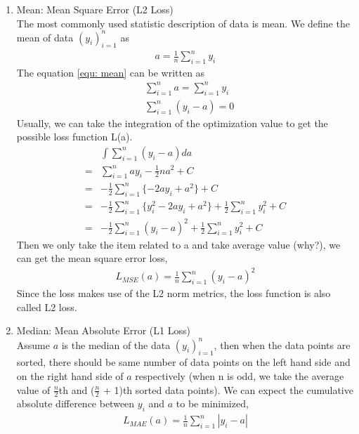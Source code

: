 \documentclass[11pt]{article}
\begin{document}
\begin{enumerate}
    \item Mean: Mean Square Error (L2 Loss)\\
    The most commonly used statistic description of data is mean. We define the mean of data $(y_i)_{i=1}^{n}$ as
    \begin{align}
        \label{equ: mean}
        a = \frac{1}{n} \sum_{i = 1}^{n} y_i
    \end{align}
     The equation \ref{equ: mean} can be written as
    \begin{align}
        & \sum_{i=1}^n a = \sum_{i = 1}^{n} y_i\\
        & \sum_{i = 1}^{n} (y_i - a) = 0
    \end{align}
    Usually, we can take the integration of the optimization value to get the possible loss function L(a).
    \begin{align}
        & \int \sum_{i = 1}^{n} (y_i - a) da\\
        =& \sum_{i = 1}^{n} ay_i - \frac{1}{2}n a^2 + C\\
        =& -\frac{1}{2}\sum_{i = 1}^{n} \{-2ay_i + a^2\} + C\\
        =& -\frac{1}{2}\sum_{i = 1}^{n} \{y_i^2 -2ay_i + a^2\} + \frac{1}{2}\sum_{i=1}^n y_i^2 + C\\
        =& -\frac{1}{2}\sum_{i = 1}^{n} (y_i - a)^2 + \frac{1}{2}\sum_{i=1}^n y_i^2 + C
    \end{align}
    Then we only take the item related to a and take average value (why?), we can get the mean square error loss,
    \begin{align}
        L_{MSE}(a) = \frac{1}{n} \sum_{i=1}^{n} (y_i - a)^2
    \end{align}
    Since the loss makes use of the L2 norm metrics, the loss function is also called L2 loss. 
    \item Median: Mean Absolute Error (L1 Loss)\\
    Assume $a$ is the median of the data $(y_i)_{i=1}^n$, then when the data points are sorted, there should be same number of data points on the left hand side and on the right hand side of $a$ respectively (when n is odd, we take the average value of $\frac{n}{2}$th and ($\frac{n}{2}$ + 1)th sorted data points). We can expect the cumulative absolute difference between $y_i$ and $a$ to be minimized,
    \begin{align}
        L_{MAE}(a) = \frac{1}{n} \sum_{i = 1}^n |y_i - a|
    \end{align}

\end{enumerate}
\end{document}
